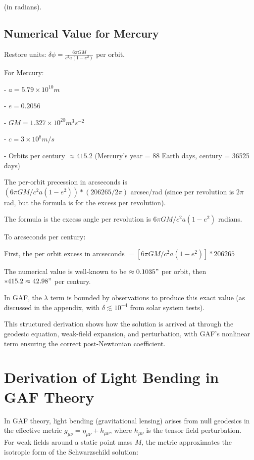 \documentclass{article}
\begin{document}
(in radians).

\subsection{Numerical Value for Mercury}

Restore units: \(\delta \phi = \frac{6 \pi GM}{c^2 a (1 - e^2)}\) per orbit.

For Mercury:

- \(a = 5.79 \times 10^{10} m\)

- \(e = 0.2056\)

- \(GM = 1.327 \times 10^{20} m^3 s^{-2}\)

- \(c = 3 \times 10^8 m/s\)

- Orbits per century \(\approx 415.2\) (Mercury's year = 88 Earth days, century = 36525 days)

The per-orbit precession in arcseconds is \((6 \pi GM / c^2 a (1 - e^2)) * (206265 / 2\pi)\) arcsec/rad (since per revolution is \(2\pi\) rad, but the formula is for the excess per revolution).

The formula is the excess angle per revolution is \(6 \pi GM / c^2 a (1 - e^2)\) radians.

To arcseconds per century:

First, the per orbit excess in arcseconds \(= [6 \pi GM / c^2 a (1 - e^2)] * 206265\)

The numerical value is well-known to be \(\approx 0.1035 "\) per orbit, then \(* 415.2 \approx 42.98 "\) per century.

In GAF, the \(\lambda\) term is bounded by observations to produce this exact value (as discussed in the appendix, with \(\delta \lesssim 10^{-4}\) from solar system tests).

This structured derivation shows how the solution is arrived at through the geodesic equation, weak-field expansion, and perturbation, with GAF's nonlinear term ensuring the correct post-Newtonian coefficient.

\section{Derivation of Light Bending in GAF Theory}

In GAF theory, light bending (gravitational lensing) arises from null geodesics in the effective metric \( g_{\mu\nu} = \eta_{\mu\nu} + h_{\mu\nu} \), where \( h_{\mu\nu} \) is the tensor field perturbation. For weak fields around a static point mass \( M \), the metric approximates the isotropic form of the Schwarzschild solution:
\end{document}
